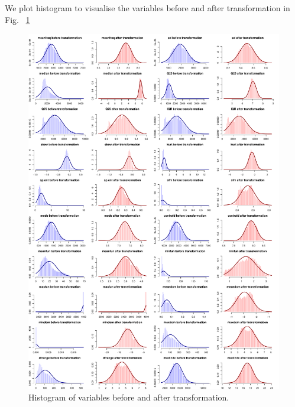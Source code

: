 \documentclass{article}
\begin{document}
	We plot histogram to visualise the variables before and after transformation in Fig. ~\ref{transformation_hist}
	\begin{figure}
		\centering
		\includegraphics[width=\textwidth]{graphs/transformations_hist.pdf}
		\caption{Histogram of variables before and after transformation.}
		\label{transformation_hist}
	\end{figure}
	
\end{document}
